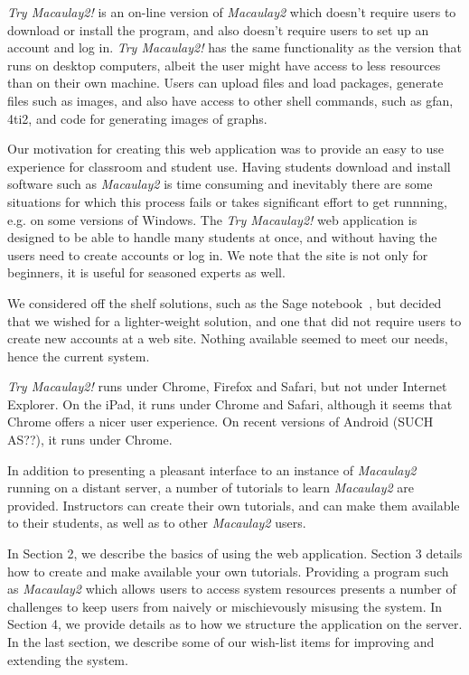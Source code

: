 \documentclass[]{article}
\begin{document}
{\it Try Macaulay2!} is an on-line version of {\it Macaulay2} which
doesn't require users to download or install the program, and also
doesn't require users to set up an account and log in.  {\it Try
  Macaulay2!}  has the same functionality as the version that runs on
desktop computers, albeit the user might have access to less resources
than on their own machine.  Users can upload files and
load packages, generate files such as images, and also have
access to other shell commands, such as gfan, 4ti2, and code for
generating images of graphs.

Our motivation for creating this web application was to provide an
easy to use experience for classroom and student use.  Having students
download and install software such as {\it Macaulay2} is time
consuming and inevitably there are some situations for which this
process fails or takes significant effort to get runnning, e.g. on
some versions of Windows.  The {\it Try Macaulay2!} web application is
designed to be able to handle many students at once, and without
having the users need to create accounts or log in.  We note that the
site is not only for beginners, it is useful for seasoned experts as
well.

We considered off the shelf solutions, such as the Sage
notebook~\cite{sagenotebook}, but decided that we wished for a
lighter-weight solution, and one that did not require users to create
new accounts at a web site.  Nothing available seemed to meet our
needs, hence the current system.

{\it Try Macaulay2!} runs under Chrome, Firefox and Safari, but not
under Internet Explorer.  On the iPad, it runs under Chrome and
Safari, although it seems that Chrome offers a nicer user experience.
On recent versions of Android (SUCH AS??), it runs under Chrome.

In addition to presenting a pleasant interface to an instance of {\it
  Macaulay2} running on a distant server, a number of tutorials to
learn {\it Macaulay2} are provided.  Instructors can create their own
tutorials, and can make them available to their students, as well as
to other {\it Macaulay2} users.  

In Section 2, we describe the basics of using the web application.
Section 3 details how to create and make available your own tutorials.
Providing a program such as {\it Macaulay2} which allows users to
access system resources presents a number of challenges to keep users
from naively or mischievously misusing the system.  In Section 4, we
provide details as to how we structure the application on the server.
In the last section, we describe some of our wish-list items for
improving and extending the system.
\end{document}
